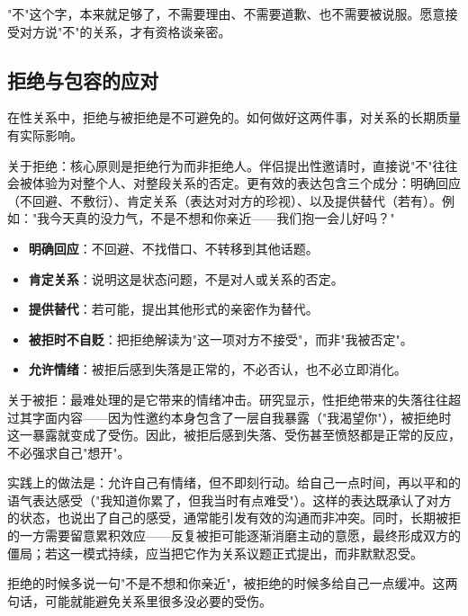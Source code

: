 \documentclass[12pt,UTF8]{ctexbook}
\newcommand{\keyword}[1]{\textbf{#1}}
\begin{document}
\begin{tcolorbox}[colback=pink!5!white,colframe=red!50!black,title=贴心小叮咛]
"不"这个字，本来就足够了，不需要理由、不需要道歉、也不需要被说服。愿意接受对方说"不"的关系，才有资格谈亲密。
\end{tcolorbox}
\subsection{拒绝与包容的应对}

在性关系中，拒绝与被拒绝是不可避免的。如何做好这两件事，对关系的长期质量有实际影响。

关于拒绝：核心原则是拒绝行为而非拒绝人。伴侣提出性邀请时，直接说"不"往往会被体验为对整个人、对整段关系的否定。更有效的表达包含三个成分：明确回应（不回避、不敷衍）、肯定关系（表达对对方的珍视）、以及提供替代（若有）。例如："我今天真的没力气，不是不想和你亲近——我们抱一会儿好吗？"

\begin{itemize}
  \item \keyword{明确回应}：不回避、不找借口、不转移到其他话题。
  \item \keyword{肯定关系}：说明这是状态问题，不是对人或关系的否定。
  \item \keyword{提供替代}：若可能，提出其他形式的亲密作为替代。
  \item \keyword{被拒时不自贬}：把拒绝解读为"这一项对方不接受"，而非"我被否定"。
  \item \keyword{允许情绪}：被拒后感到失落是正常的，不必否认，也不必立即消化。
\end{itemize}

关于被拒：最难处理的是它带来的情绪冲击。研究显示，性拒绝带来的失落往往超过其字面内容——因为性邀约本身包含了一层自我暴露（"我渴望你"），被拒绝时这一暴露就变成了受伤。因此，被拒后感到失落、受伤甚至愤怒都是正常的反应，不必强求自己"想开"。

实践上的做法是：允许自己有情绪，但不即刻行动。给自己一点时间，再以平和的语气表达感受（"我知道你累了，但我当时有点难受"）。这样的表达既承认了对方的状态，也说出了自己的感受，通常能引发有效的沟通而非冲突。同时，长期被拒的一方需要留意累积效应——反复被拒可能逐渐消磨主动的意愿，最终形成双方的僵局；若这一模式持续，应当把它作为关系议题正式提出，而非默默忍受。

\begin{tcolorbox}[colback=pink!5!white,colframe=red!50!black,title=贴心小叮咛]
拒绝的时候多说一句"不是不想和你亲近"，被拒绝的时候多给自己一点缓冲。这两句话，可能就能避免关系里很多没必要的受伤。
\end{tcolorbox}
\end{document}
